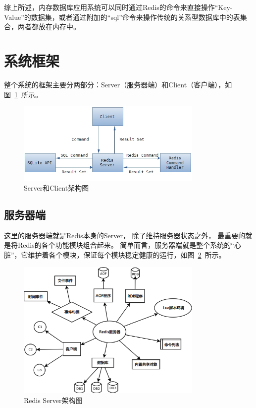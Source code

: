 \documentclass{zjutthesis}
\begin{document}
综上所述，内存数据库应用系统可以同时通过Redis的命令来直接操作“Key-Value”的数据集，或者通过附加的“sql”命令来操作传统的关系型数据库中的表集合，两者都放在内存中。

\section{系统框架}
整个系统的框架主要分两部分：Server（服务器端）和Client（客户端），如图~\ref{fig:Server-Client}~所示。
\begin{figure}[H]
\centering
\includegraphics[width=0.8\textwidth]{Server-Client}
\caption{Server和Client架构图}\label{fig:Server-Client}
\vspace{\baselineskip} %
\end{figure}

\subsection{服务器端}
这里的服务器端就是Redis本身的Server， 除了维持服务器状态之外， 最重要的就是将Redis的各个功能模块组合起来。
简单而言，服务器端就是整个系统的“心脏”，它维护着各个模块，保证每个模块稳定健康的运行，如图~\ref{fig:Redis-Server}~所示。
\begin{figure}[H]
\centering
\includegraphics[width=0.8\textwidth]{Redis-Server}
\caption{Redis Server架构图}\label{fig:Redis-Server}
\vspace{\baselineskip} %
\end{figure}
\end{document}
